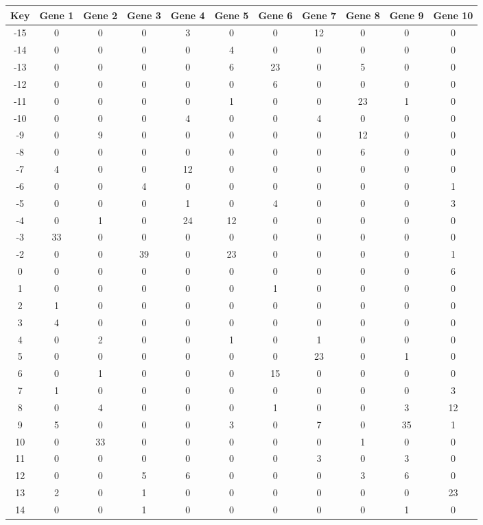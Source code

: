 \begin{tabular}{|c|c|c|c|c|c|c|c|c|c|c|}
\hline
Key & Gene 1 & Gene 2 & Gene 3 & Gene 4 & Gene 5 & Gene 6 & Gene 7 & Gene 8 & Gene 9 & Gene 10 \\
\hline
-15 & 0 & 0 & 0 & 3 & 0 & 0 & 12 & 0 & 0 & 0 \\
-14 & 0 & 0 & 0 & 0 & 4 & 0 & 0 & 0 & 0 & 0 \\
-13 & 0 & 0 & 0 & 0 & 6 & 23 & 0 & 5 & 0 & 0 \\
-12 & 0 & 0 & 0 & 0 & 0 & 6 & 0 & 0 & 0 & 0 \\
-11 & 0 & 0 & 0 & 0 & 1 & 0 & 0 & 23 & 1 & 0 \\
-10 & 0 & 0 & 0 & 4 & 0 & 0 & 4 & 0 & 0 & 0 \\
-9 & 0 & 9 & 0 & 0 & 0 & 0 & 0 & 12 & 0 & 0 \\
-8 & 0 & 0 & 0 & 0 & 0 & 0 & 0 & 6 & 0 & 0 \\
-7 & 4 & 0 & 0 & 12 & 0 & 0 & 0 & 0 & 0 & 0 \\
-6 & 0 & 0 & 4 & 0 & 0 & 0 & 0 & 0 & 0 & 1 \\
-5 & 0 & 0 & 0 & 1 & 0 & 4 & 0 & 0 & 0 & 3 \\
-4 & 0 & 1 & 0 & 24 & 12 & 0 & 0 & 0 & 0 & 0 \\
-3 & 33 & 0 & 0 & 0 & 0 & 0 & 0 & 0 & 0 & 0 \\
-2 & 0 & 0 & 39 & 0 & 23 & 0 & 0 & 0 & 0 & 1 \\
0 & 0 & 0 & 0 & 0 & 0 & 0 & 0 & 0 & 0 & 6 \\
1 & 0 & 0 & 0 & 0 & 0 & 1 & 0 & 0 & 0 & 0 \\
2 & 1 & 0 & 0 & 0 & 0 & 0 & 0 & 0 & 0 & 0 \\
3 & 4 & 0 & 0 & 0 & 0 & 0 & 0 & 0 & 0 & 0 \\
4 & 0 & 2 & 0 & 0 & 1 & 0 & 1 & 0 & 0 & 0 \\
5 & 0 & 0 & 0 & 0 & 0 & 0 & 23 & 0 & 1 & 0 \\
6 & 0 & 1 & 0 & 0 & 0 & 15 & 0 & 0 & 0 & 0 \\
7 & 1 & 0 & 0 & 0 & 0 & 0 & 0 & 0 & 0 & 3 \\
8 & 0 & 4 & 0 & 0 & 0 & 1 & 0 & 0 & 3 & 12 \\
9 & 5 & 0 & 0 & 0 & 3 & 0 & 7 & 0 & 35 & 1 \\
10 & 0 & 33 & 0 & 0 & 0 & 0 & 0 & 1 & 0 & 0 \\
11 & 0 & 0 & 0 & 0 & 0 & 0 & 3 & 0 & 3 & 0 \\
12 & 0 & 0 & 5 & 6 & 0 & 0 & 0 & 3 & 6 & 0 \\
13 & 2 & 0 & 1 & 0 & 0 & 0 & 0 & 0 & 0 & 23 \\
14 & 0 & 0 & 1 & 0 & 0 & 0 & 0 & 0 & 1 & 0 \\
\hline
\end{tabular}